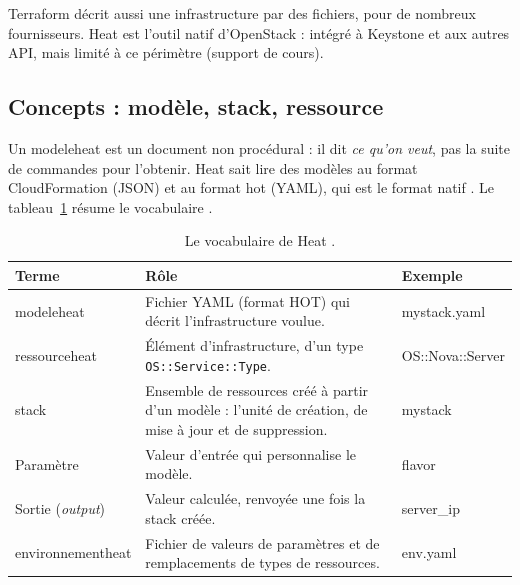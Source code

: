 \begin{remarque}
Terraform décrit aussi une infrastructure par des fichiers, pour de nombreux fournisseurs. Heat est l'outil natif d'OpenStack :
intégré à Keystone et aux autres API, mais limité à ce périmètre (support de cours).
\end{remarque}

\subsection{Concepts : modèle, stack, ressource}\label{sec:he-concepts}

Un \gls{modeleheat} est un document non procédural : il dit \emph{ce qu'on veut}, pas la suite de commandes pour l'obtenir.
Heat sait lire des modèles au format CloudFormation (JSON) et au format \gls{hot} (YAML), qui est le format natif
\parencite{heat-intro}. Le tableau~\ref{tab:he-objets} résume le vocabulaire \parencite{heat-glossary}.

\begin{table}[!ht]
\centering
\renewcommand{\arraystretch}{1.3}
\begin{tabular}{@{}>{\raggedright\arraybackslash}p{3.0cm}>{\raggedright\arraybackslash}p{8.4cm}>{\raggedright\arraybackslash\ttfamily\small}p{4.1cm}@{}}
\toprule
\textbf{Terme} & \textbf{Rôle} & \textrm{\textbf{Exemple}} \\
\midrule
\Gls{modeleheat} & Fichier YAML (format HOT) qui décrit l'infrastructure voulue. & mystack.yaml \\
\Gls{ressourceheat} & Élément d'infrastructure, d'un type \texttt{OS::Service::Type}. & OS::Nova::Server \\
\Gls{stack} & Ensemble de ressources créé à partir d'un modèle : l'unité de création, de mise à jour et de suppression. & mystack \\
Paramètre & Valeur d'entrée qui personnalise le modèle. & flavor \\
Sortie (\emph{output}) & Valeur calculée, renvoyée une fois la stack créée. & server\_ip \\
\Gls{environnementheat} & Fichier de valeurs de paramètres et de remplacements de types de ressources. & env.yaml \\
\bottomrule
\end{tabular}
\caption{Le vocabulaire de Heat \parencite{heat-glossary}.}
\label{tab:he-objets}
\end{table}

